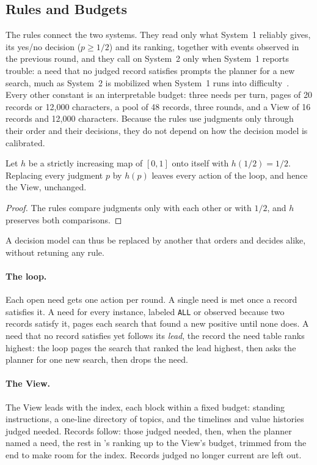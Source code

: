 \subsection{Rules and Budgets}
\label{sec:rules}

The rules connect the two systems.
They read only what System~1 reliably gives, its yes/no decision ($p \ge 1/2$) and its ranking, together with events observed in the previous round, and they call on System~2 only when System~1 reports trouble: a need that no judged record satisfies prompts the planner for a new search, much as System~2 is mobilized when System~1 runs into difficulty~\citep{kahneman2011thinking}.
Every other constant is an interpretable budget: three needs per turn, pages of 20 records or 12,000 characters, a pool of 48 records, three rounds, and a View of 16 records and 12,000 characters.
Because the rules use judgments only through their order and their decisions, they do not depend on how the decision model is calibrated.

\begin{proposition}
\label{prop:calibration}
Let $h$ be a strictly increasing map of $[0, 1]$ onto itself with $h(1/2) = 1/2$.
Replacing every judgment $p$ by $h(p)$ leaves every action of the loop, and hence the View, unchanged.
\end{proposition}
\begin{proof}
The rules compare judgments only with each other or with $1/2$, and $h$ preserves both comparisons.
\end{proof}

\noindent A decision model can thus be replaced by another that orders and decides alike, without retuning any rule.

\paragraph{The loop.}
Each open need gets one action per round.
A single need is met once a record satisfies it.
A need for every instance, labeled \texttt{ALL} or observed because two records satisfy it, pages each search that found a new positive until none does.
A need that no record satisfies yet follows its \emph{lead}, the record the need table ranks highest: the loop pages the search that ranked the lead highest, then asks the planner for one new search, then drops the need.

\paragraph{The View.}
The View leads with the index, each block within a fixed budget: standing instructions, a one-line directory of topics, and the timelines and value histories \jev{} judged needed.
Records follow: those judged needed, then, when the planner named a need, the rest in \jev's ranking up to the View's budget, trimmed from the end to make room for the index.
Records judged no longer current are left out.

